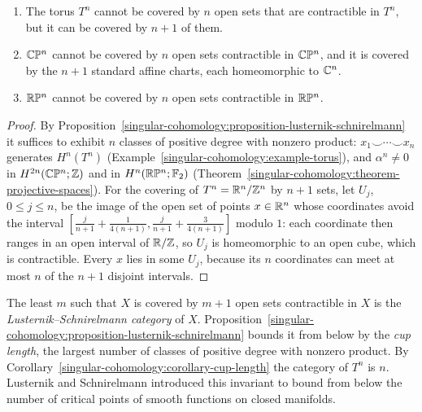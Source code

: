 \begin{corollary}\label{singular-cohomology:corollary-cup-length}
\begin{enumerate}
\item The torus $T^n$ cannot be covered by $n$ open sets that are contractible in $T^n$, but it can be covered by $n + 1$ of them.
\item $\mathbb{C}\mathbb{P}^n$ cannot be covered by $n$ open sets contractible in $\mathbb{C}\mathbb{P}^n$, and it is covered by the $n + 1$ standard affine charts, each homeomorphic to $\mathbb{C}^n$.
\item $\mathbb{R}\mathbb{P}^n$ cannot be covered by $n$ open sets contractible in $\mathbb{R}\mathbb{P}^n$.
\end{enumerate}
\end{corollary}

\begin{proof}
By Proposition~\ref{singular-cohomology:proposition-lusternik-schnirelmann} it suffices to exhibit $n$ classes of positive degree with nonzero product: $x_1 \smile \cdots \smile x_n$ generates $H^n(T^n)$
(Example~\ref{singular-cohomology:example-torus}), and $\alpha^n \neq 0$ in $H^{2n}(\mathbb{C}\mathbb{P}^n; \mathbb{Z})$ and in $H^n(\mathbb{R}\mathbb{P}^n; \mathbb{F}_2)$ (Theorem~\ref{singular-cohomology:theorem-projective-spaces}). For the
covering of $T^n = \mathbb{R}^n/\mathbb{Z}^n$ by $n + 1$ sets, let $U_j$, $0 \leq j \leq n$, be the image of the open set of points $x \in \mathbb{R}^n$ whose coordinates avoid the interval
$[\frac{j}{n+1} + \frac{1}{4(n+1)}, \frac{j}{n+1} + \frac{3}{4(n+1)}]$ modulo $1$: each coordinate then ranges in an open interval of $\mathbb{R}/\mathbb{Z}$, so $U_j$ is homeomorphic to an open cube, which is contractible.
Every $x$ lies in some $U_j$, because its $n$ coordinates can meet at most $n$ of the $n + 1$ disjoint intervals.
\end{proof}

\begin{remark}\label{singular-cohomology:remark-ls-category}
The least $m$ such that $X$ is covered by $m + 1$ open sets contractible in $X$ is the \emph{Lusternik--Schnirelmann category} of $X$. Proposition~\ref{singular-cohomology:proposition-lusternik-schnirelmann} bounds it from
below by the \emph{cup length}, the largest number of classes of positive degree with nonzero product. By Corollary~\ref{singular-cohomology:corollary-cup-length} the category of $T^n$ is $n$. Lusternik and
Schnirelmann introduced this invariant to bound from below the number of critical points of smooth functions on closed manifolds.
\end{remark}

